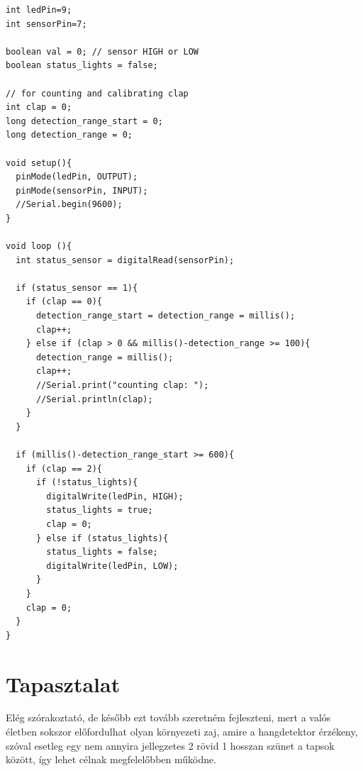 \documentclass[a4paper,11pt]{article}
\begin{document}
\begin{lstlisting}
int ledPin=9;
int sensorPin=7;

boolean val = 0; // sensor HIGH or LOW
boolean status_lights = false;

// for counting and calibrating clap
int clap = 0;
long detection_range_start = 0;
long detection_range = 0;

void setup(){
  pinMode(ledPin, OUTPUT);
  pinMode(sensorPin, INPUT);
  //Serial.begin(9600);
}
  
void loop (){
  int status_sensor = digitalRead(sensorPin);
  
  if (status_sensor == 1){
    if (clap == 0){
      detection_range_start = detection_range = millis();
      clap++; 
    } else if (clap > 0 && millis()-detection_range >= 100){
      detection_range = millis();
      clap++;
      //Serial.print("counting clap: ");
      //Serial.println(clap);
    }
  }
  
  if (millis()-detection_range_start >= 600){
    if (clap == 2){ 
      if (!status_lights){
        digitalWrite(ledPin, HIGH);
        status_lights = true;
        clap = 0;
      } else if (status_lights){
        status_lights = false;
        digitalWrite(ledPin, LOW);
      }
    }
    clap = 0;
  }
}
\end{lstlisting} 

\section{Tapasztalat}

Elég szórakoztató, de később ezt tovább szeretném fejleszteni, mert a valós életben sokszor előfordulhat olyan környezeti zaj, amire a hangdetektor érzékeny, szóval esetleg egy nem annyira jellegzetes 2 rövid 1 hosszan szünet a tapsok között, így lehet célnak megfelelőbben működne.
\end{document}
